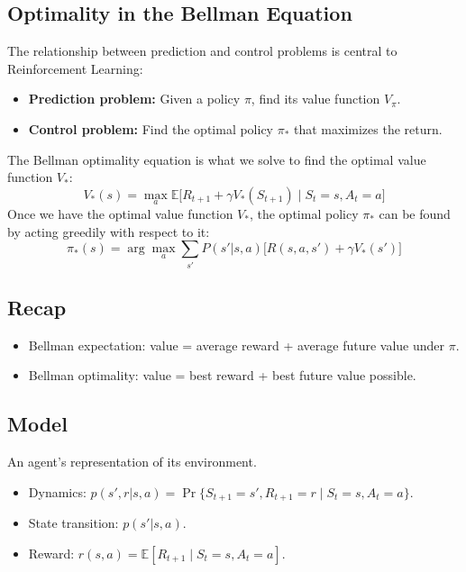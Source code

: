 \documentclass[12pt]{article}
\begin{document}
\subsection{Optimality in the Bellman Equation}
The relationship between prediction and control problems is central to Reinforcement Learning:
\begin{itemize}
    \item \textbf{Prediction problem:} Given a policy $\pi$, find its value function $V_\pi$.
    \item \textbf{Control problem:} Find the optimal policy $\pi_*$ that maximizes the return.
\end{itemize}

The Bellman optimality equation is what we solve to find the optimal value function $V_*$:
$$
V_*(s) = \max_a \mathbb{E} \big[ R_{t+1} + \gamma V_*(S_{t+1}) \mid S_t=s, A_t=a \big]
$$
Once we have the optimal value function $V_*$, the optimal policy $\pi_*$ can be found by acting greedily with respect to it:
$$
\pi_*(s) = \arg\max_a \sum_{s'} P(s'|s,a) \big[ R(s,a,s') + \gamma V_*(s') \big]
$$
\subsection{Recap}
\begin{itemize}
    \item Bellman expectation: value = average reward + average future value under $\pi$.
    \item Bellman optimality: value = best reward + best future value possible.
\end{itemize}


\subsection{Model}
An agent's representation of its environment.
\begin{itemize}
    \item Dynamics: $p(s',r|s,a) = \Pr\{S_{t+1}=s', R_{t+1}=r \mid S_t=s, A_t=a\}$.
    \item State transition: $p(s'|s,a)$.
    \item Reward: $r(s,a) = \mathbb{E}[R_{t+1} \mid S_t=s, A_t=a]$.
\end{itemize}
\end{document}
